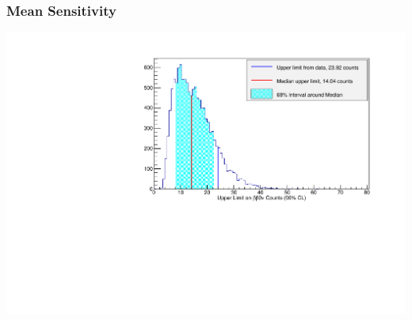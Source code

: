 \documentclass{beamer}
\begin{document}
\begin{frame}
\begin{center}
\frametitle{Mean Sensitivity}
\end{center}
\vspace{0.6cm}
\begin{center}
\includegraphics[keepaspectratio=true,width=\textwidth]{toy_mc_sensitivity.pdf}
\end{center}
\end{frame}

\end{document}
